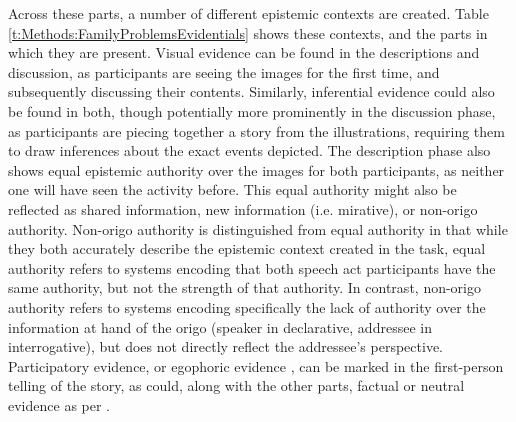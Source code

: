 Across these parts, a number of different epistemic contexts are created. Table \ref{t:Methods:FamilyProblemsEvidentials} shows these contexts, and the parts in which they are present. Visual evidence can be found in the descriptions and discussion, as participants are seeing the images for the first time, and subsequently discussing their contents. Similarly, inferential evidence could also be found in both, though potentially more prominently in the discussion phase, as participants are piecing together a story from the illustrations, requiring them to draw inferences about the exact events depicted. The description phase also shows equal epistemic authority over the images for both participants, as neither one will have seen the activity before. This equal authority might also be reflected as shared information, new information (i.e. mirative), or non-origo authority. Non-origo authority is distinguished from equal authority in that while they both accurately describe the epistemic context created in the task, equal authority refers to systems encoding that both speech act participants have the same authority, but not the strength of that authority. In contrast, non-origo authority refers to systems encoding specifically the lack of authority over the information at hand of the origo (speaker in declarative, addressee in interrogative), but does not directly reflect the addressee's perspective. Participatory evidence, or egophoric evidence \cite{Gawne2017}, can be marked in the first-person telling of the story, as could, along with the other parts, factual or neutral evidence as per .

\begin{table}\caption{Epistemic contexts covered by each part of the Family Problems Picture Task}\label{t:Methods:FamilyProblemsEvidentials}
       \noindent{}
       
\end{table}


